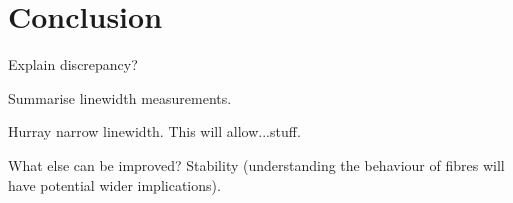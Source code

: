 \section{Conclusion}

{\color{red} Explain discrepancy?}

Summarise linewidth measurements.

Hurray narrow linewidth.
This will allow...stuff.

What else can be improved? Stability (understanding the behaviour of fibres will have potential wider implications).
